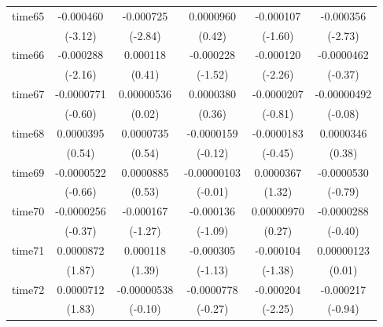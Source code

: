 \begin{table}[htbp]
\begin{tabular}{l*{5}{c}}
time65      &   -0.000460\sym{**} &   -0.000725\sym{**} &   0.0000960         &   -0.000107         &   -0.000356\sym{**} \\
            &     (-3.12)         &     (-2.84)         &      (0.42)         &     (-1.60)         &     (-2.73)         \\
time66      &   -0.000288\sym{*}  &    0.000118         &   -0.000228         &   -0.000120\sym{*}  &  -0.0000462         \\
            &     (-2.16)         &      (0.41)         &     (-1.52)         &     (-2.26)         &     (-0.37)         \\
time67      &  -0.0000771         &  0.00000536         &   0.0000380         &  -0.0000207         & -0.00000492         \\
            &     (-0.60)         &      (0.02)         &      (0.36)         &     (-0.81)         &     (-0.08)         \\
time68      &   0.0000395         &   0.0000735         &  -0.0000159         &  -0.0000183         &   0.0000346         \\
            &      (0.54)         &      (0.54)         &     (-0.12)         &     (-0.45)         &      (0.38)         \\
time69      &  -0.0000522         &   0.0000885         & -0.00000103         &   0.0000367         &  -0.0000530         \\
            &     (-0.66)         &      (0.53)         &     (-0.01)         &      (1.32)         &     (-0.79)         \\
time70      &  -0.0000256         &   -0.000167         &   -0.000136         &  0.00000970         &  -0.0000288         \\
            &     (-0.37)         &     (-1.27)         &     (-1.09)         &      (0.27)         &     (-0.40)         \\
time71      &   0.0000872         &    0.000118         &   -0.000305         &   -0.000104         &  0.00000123         \\
            &      (1.87)         &      (1.39)         &     (-1.13)         &     (-1.38)         &      (0.01)         \\
time72      &   0.0000712         & -0.00000538         &  -0.0000778         &   -0.000204\sym{*}  &   -0.000217         \\
            &      (1.83)         &     (-0.10)         &     (-0.27)         &     (-2.25)         &     (-0.94)         \\

\end{tabular}
\end{table}
